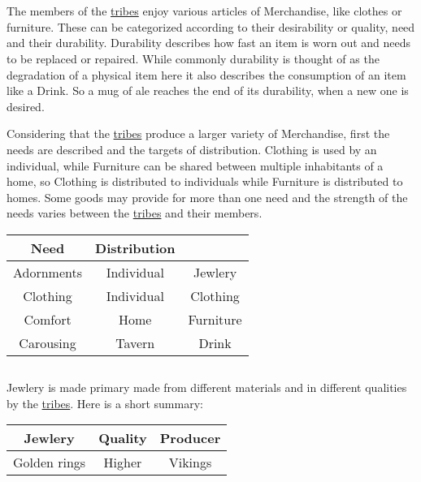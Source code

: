 \section{}\label{ch:Goods:Merchandise}

The members of the \hyperref[ch:Tribes]{tribes} enjoy various articles of
\gls*{Merchandise}, like clothes or furniture. These can be categorized
according to their desirability or quality, need and their durability.
Durability describes how fast an item is worn out and needs to be replaced or
repaired. While commonly durability is thought of as the degradation of a
physical item here it also describes the consumption of an item like a
\gls{Drink}. So a mug of ale reaches the end of its durability, when a new one
is desired.

Considering that the \hyperref[ch:Tribes]{tribes} produce a larger variety of
\gls*{Merchandise}, first the needs are described and the targets of
distribution. \Gls{Clothing} is used by an individual, while \gls{Furniture}
can be shared between multiple inhabitants of a home, so \Gls{Clothing} is
distributed to individuals while \gls{Furniture} is distributed to homes. Some
goods may provide for more than one need and the strength of the needs varies
between the \hyperref[ch:Tribes]{tribes} and their members.

\begin{longtable}{ccc}
	\toprule
	Need       & Distribution & \GLS{Merchandise} \\
	\midrule
	Adornments & Individual   & \Gls{Jewlery}     \\
	Clothing   & Individual   & \Gls{Clothing}    \\
	Comfort    & Home         & \Gls{Furniture}   \\
	Carousing  & Tavern       & \Gls{Drink}       \\
	\bottomrule
\end{longtable}

\subsection{}\label{ch:Goods:Merchandise:Jewlery}

\Gls{Jewlery} is made primary made from different materials and in different qualities by the
\hyperref[ch:Tribes]{tribes}. Here is a short summary:

\begin{longtable}{ccc}
	\toprule
	\Gls*{Jewlery} & Quality & Producer      \\
	\midrule
	Golden rings   & Higher  & \Gls{Vikings} \\ \bottomrule
\end{longtable}

